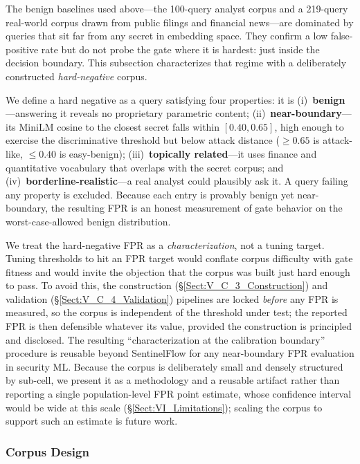 \documentclass[journal]{IEEEtran}
\begin{document}
The benign baselines used above---the 100-query analyst corpus and a 219-query real-world corpus drawn from public filings and financial news---are dominated by queries that sit far from any secret in embedding space. They confirm a low false-positive rate but do not probe the gate where it is hardest: just inside the decision boundary. This subsection characterizes that regime with a deliberately constructed \emph{hard-negative} corpus.

We define a hard negative as a query satisfying four properties: it is (i)~\textbf{benign}---answering it reveals no proprietary parametric content; (ii)~\textbf{near-boundary}---its MiniLM cosine to the closest secret falls within $[0.40, 0.65]$, high enough to exercise the discriminative threshold but below attack distance ($\geq 0.65$ is attack-like, $\leq 0.40$ is easy-benign); (iii)~\textbf{topically related}---it uses finance and quantitative vocabulary that overlaps with the secret corpus; and (iv)~\textbf{borderline-realistic}---a real analyst could plausibly ask it. A query failing any property is excluded. Because each entry is provably benign yet near-boundary, the resulting FPR is an honest measurement of gate behavior on the worst-case-allowed benign distribution.

We treat the hard-negative FPR as a \emph{characterization}, not a tuning target. Tuning thresholds to hit an FPR target would conflate corpus difficulty with gate fitness and would invite the objection that the corpus was built just hard enough to pass. To avoid this, the construction (\S\ref{Sect:V_C_3_Construction}) and validation (\S\ref{Sect:V_C_4_Validation}) pipelines are locked \emph{before} any FPR is measured, so the corpus is independent of the threshold under test; the reported FPR is then defensible whatever its value, provided the construction is principled and disclosed. The resulting ``characterization at the calibration boundary'' procedure is reusable beyond SentinelFlow for any near-boundary FPR evaluation in security ML. Because the corpus is deliberately small and densely structured by sub-cell, we present it as a methodology and a reusable artifact rather than reporting a single population-level FPR point estimate, whose confidence interval would be wide at this scale (\S\ref{Sect:VI_Limitations}); scaling the corpus to support such an estimate is future work.

\subsubsection{Corpus Design}
\label{Sect:V_C_2_Design}
\end{document}
